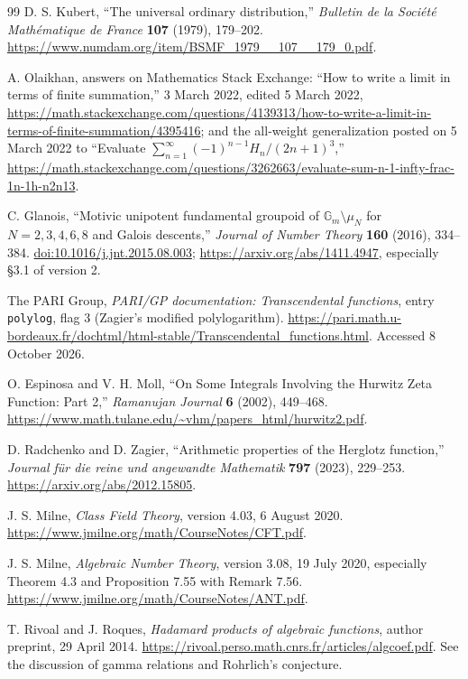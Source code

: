 \documentclass[11pt,a4paper]{article}
\theoremstyle{definition}
\theoremstyle{remark}
\numberwithin{equation}{section}
\begin{document}
\begin{thebibliography}{99}
D. S. Kubert, “The universal ordinary distribution,”
\emph{Bulletin de la Soci\'et\'e Math\'ematique de France}
\textbf{107} (1979), 179--202.
\url{https://www.numdam.org/item/BSMF_1979__107__179_0.pdf}.

A. Olaikhan, answers on Mathematics Stack Exchange:
“How to write a limit in terms of finite summation,”
3 March 2022, edited 5 March 2022,
\url{https://math.stackexchange.com/questions/4139313/how-to-write-a-limit-in-terms-of-finite-summation/4395416};
and the all-weight generalization posted on 5 March 2022 to
“Evaluate $\sum_{n=1}^{\infty}(-1)^{n-1}H_n/(2n+1)^3$,”
\url{https://math.stackexchange.com/questions/3262663/evaluate-sum-n-1-infty-frac-1n-1h-n2n13}.

C. Glanois, “Motivic unipotent fundamental groupoid of
$\mathbb G_m\setminus\mu_N$ for $N=2,3,4,6,8$ and Galois descents,”
\emph{Journal of Number Theory} \textbf{160} (2016), 334--384.
\href{https://doi.org/10.1016/j.jnt.2015.08.003}{doi:10.1016/j.jnt.2015.08.003};
\url{https://arxiv.org/abs/1411.4947}, especially \S3.1 of version 2.

The PARI Group, \emph{PARI/GP documentation: Transcendental functions},
entry \texttt{polylog}, flag $3$ (Zagier's modified polylogarithm).
\url{https://pari.math.u-bordeaux.fr/dochtml/html-stable/Transcendental_functions.html}.
Accessed 8 October 2026.

O. Espinosa and V. H. Moll, “On Some Integrals Involving the
Hurwitz Zeta Function: Part 2,” \emph{Ramanujan Journal}
\textbf{6} (2002), 449--468.
\url{https://www.math.tulane.edu/~vhm/papers_html/hurwitz2.pdf}.

D. Radchenko and D. Zagier, “Arithmetic properties of the Herglotz
function,” \emph{Journal f\"ur die reine und angewandte Mathematik}
\textbf{797} (2023), 229--253.
\url{https://arxiv.org/abs/2012.15805}.

J. S. Milne, \emph{Class Field Theory}, version 4.03,
6 August 2020.
\url{https://www.jmilne.org/math/CourseNotes/CFT.pdf}.

J. S. Milne, \emph{Algebraic Number Theory}, version 3.08,
19 July 2020, especially Theorem 4.3 and
Proposition 7.55 with Remark 7.56.
\url{https://www.jmilne.org/math/CourseNotes/ANT.pdf}.

T. Rivoal and J. Roques, \emph{Hadamard products of algebraic functions},
author preprint, 29 April 2014.
\url{https://rivoal.perso.math.cnrs.fr/articles/algcoef.pdf}.
See the discussion of gamma relations and Rohrlich's conjecture.

\end{thebibliography}
\endgroup
\end{document}

